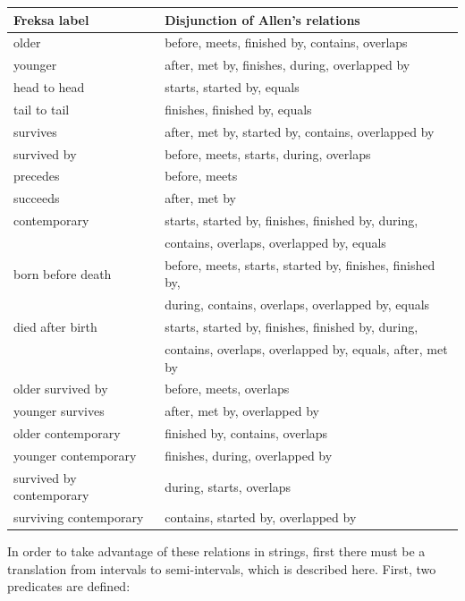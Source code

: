 \documentclass[a4paper,12pt,leqno,twoside]{article}
\begin{document}
\begin{center}
	\begin{tabular}[]{|l l|}
		\hline
		\textbf{Freksa label} & \textbf{Disjunction of Allen's relations}\\
		\hline
		older & before, meets, finished by, contains, overlaps\\
		younger & after, met by, finishes, during, overlapped by\\
		head to head & starts, started by, equals\\
		tail to tail & finishes, finished by, equals\\
		survives & after, met by, started by, contains, overlapped by\\
		survived by & before, meets, starts, during, overlaps\\
		precedes & before, meets\\
		succeeds & after, met by\\
		contemporary & starts, started by, finishes, finished by, during,\\ & contains, overlaps, overlapped by, equals\\
		born before death & before, meets, starts, started by, finishes, finished by,\\ & during, contains, overlaps, overlapped by, equals\\
		died after birth & starts, started by, finishes, finished by, during,\\ & contains, overlaps, overlapped by, equals, after, met by\\
		older survived by & before, meets, overlaps\\
		younger survives & after, met by, overlapped by\\
		older contemporary & finished by, contains, overlaps\\
		younger contemporary & finishes, during, overlapped by\\
		survived by contemporary & during, starts, overlaps\\
		surviving contemporary & contains, started by, overlapped by\\
		\hline
	\end{tabular}
	\label{tab:freksa-disjunctions}
\end{center}
In order to take advantage of these relations in strings, first there must be a translation from intervals to semi-intervals, which is described here. First, two predicates are defined:
\end{document}

